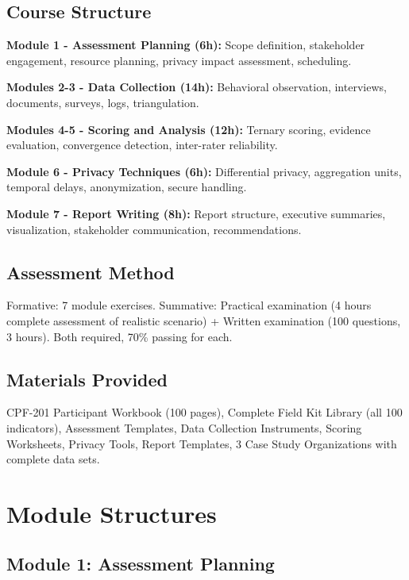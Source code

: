\documentclass[11pt,a4paper]{article}
\begin{document}
\subsection{Course Structure}

\textbf{Module 1 - Assessment Planning (6h):} Scope definition, stakeholder engagement, resource planning, privacy impact assessment, scheduling.

\textbf{Modules 2-3 - Data Collection (14h):} Behavioral observation, interviews, documents, surveys, logs, triangulation.

\textbf{Modules 4-5 - Scoring and Analysis (12h):} Ternary scoring, evidence evaluation, convergence detection, inter-rater reliability.

\textbf{Module 6 - Privacy Techniques (6h):} Differential privacy, aggregation units, temporal delays, anonymization, secure handling.

\textbf{Module 7 - Report Writing (8h):} Report structure, executive summaries, visualization, stakeholder communication, recommendations.

\subsection{Assessment Method}

Formative: 7 module exercises. Summative: Practical examination (4 hours complete assessment of realistic scenario) + Written examination (100 questions, 3 hours). Both required, 70\% passing for each.

\subsection{Materials Provided}

CPF-201 Participant Workbook (100 pages), Complete Field Kit Library (all 100 indicators), Assessment Templates, Data Collection Instruments, Scoring Worksheets, Privacy Tools, Report Templates, 3 Case Study Organizations with complete data sets.

\newpage

\section{Module Structures}

\subsection{Module 1: Assessment Planning}
\end{document}
